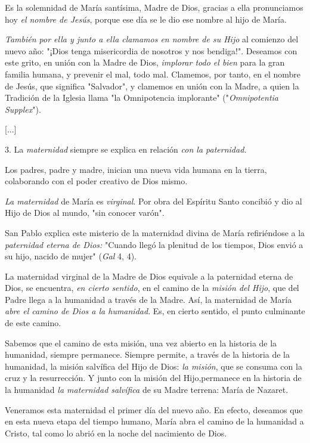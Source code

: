 \begin{body}
Es la solemnidad de María santísima, Madre de Dios, gracias a ella pronunciamos hoy \emph{el nombre de Jesús}, porque ese día se le dio ese nombre al hijo de María.

\emph{También por ella y junto a ella clamamos en nombre de su Hijo} al comienzo del nuevo año: "¡Dios tenga misericordia de nosotros y nos bendiga!". Deseamos con este grito, en unión con la Madre de Dios, \emph{implorar todo el bien} para la gran familia humana, y prevenir el mal, todo mal. Clamemos, por tanto, en el nombre de Jesús, que significa "Salvador", y clamemos en unión con la Madre, a quien la Tradición de la Iglesia llama "la Omnipotencia implorante" ("\emph{Omnipotentia 	Supplex}").

{[}...{]}

3. La \emph{maternidad} siempre se explica en relación \emph{con la 	paternidad.}

Los padres, padre y madre, inician una nueva vida humana en la tierra, colaborando con el poder creativo de Dios mismo.

\emph{La maternidad} de María es \emph{virginal}. Por obra del Espíritu Santo concibió y dio al Hijo de Dios al mundo, "sin conocer varón".

San Pablo explica este misterio de la maternidad divina de María refiriéndose a la \emph{paternidad eterna de Dios:} "Cuando llegó la plenitud de los tiempos, Dios envió a su hijo, nacido de mujer" (\emph{Gal} 4, 4).

La maternidad virginal de la Madre de Dios equivale a la paternidad eterna de Dios, se encuentra, \emph{en cierto sentido}, en el camino de la \emph{misión del Hijo}, que del Padre llega a la humanidad a través de la Madre. Así, la maternidad de María \emph{abre el camino de Dios a 	la humanidad}. Es, en cierto sentido, el punto culminante de este camino.

Sabemos que el camino de esta misión, una vez abierto en la historia de la humanidad, siempre permanece. Siempre permite, a través de la historia de la humanidad, la misión salvífica del Hijo de Dios: \emph{la 	misión}, que se consuma con la cruz y la resurrección. Y junto con la misión del Hijo,permanece en la historia de la humanidad \emph{la 	maternidad salvífica} de su Madre terrena: María de Nazaret.

Veneramos esta maternidad el primer día del nuevo año. En efecto, deseamos que en esta nueva etapa del tiempo humano, María abra el camino de la humanidad a Cristo, tal como lo abrió en la noche del nacimiento de Dios.


\end{body}
